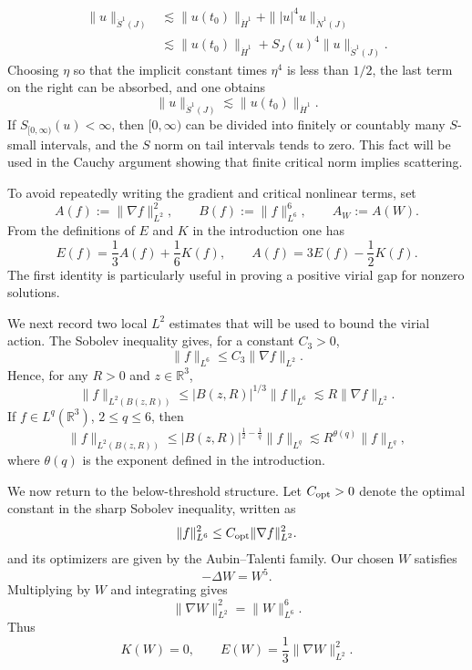 \documentclass[smallextended,envcountsect,nospthms]{svjour3}
\numberwithin{equation}{section}
\theoremstyle{spbreak}
\theoremstyle{spdefbreak}
\theoremstyle{spdefbreak}
\newcommand{\R}{\mathbb R}
\newcommand{\Nd}{\dot N^1}
\newcommand{\Sd}{\dot S^1}
\begin{document}
\[
\begin{aligned}
  \|u\|_{\Sd(J)}
  &\lesssim \|u(t_0)\|_{\dot H^1}
     +\||u|^4u\|_{\Nd(J)}  \\
  &\lesssim \|u(t_0)\|_{\dot H^1}
     +S_J(u)^4\|u\|_{\Sd(J)}.
\end{aligned}
\]
Choosing $\eta$ so that the implicit constant times $\eta^4$ is less than $1/2$, the last term on the right can be absorbed, and one obtains
\[
  \|u\|_{\Sd(J)}\lesssim \|u(t_0)\|_{\dot H^1}.
\]
If $S_{[0,\infty)}(u)<\infty$, then $[0,\infty)$ can be divided into finitely or countably many $S$-small intervals, and the $S$ norm on tail intervals tends to zero. This fact will be used in the Cauchy argument showing that finite critical norm implies scattering.

To avoid repeatedly writing the gradient and critical nonlinear terms, set
\begin{equation*}
  A(f):=\|\nabla f\|_{L^2}^2,
  \qquad B(f):=\|f\|_{L^6}^6,
  \qquad A_W:=A(W).
\end{equation*}
From the definitions of $E$ and $K$ in the introduction one has
\begin{equation}\label{eq:E-via-A-K}
  E(f)=\frac13A(f)+\frac16K(f),
  \qquad A(f)=3E(f)-\frac12K(f).
\end{equation}
The first identity is particularly useful in proving a positive virial gap for nonzero solutions.

We next record two local $L^2$ estimates that will be used to bound the virial action. The Sobolev inequality gives, for a constant $C_3>0$,
\begin{equation*}
  \|f\|_{L^6}\le C_3\|\nabla f\|_{L^2}.
\end{equation*}
Hence, for any $R>0$ and $z\in\R^3$,
\begin{equation}\label{eq:local-L2-basic}
  \|f\|_{L^2(B(z,R))}
  \le |B(z,R)|^{1/3}\|f\|_{L^6}
  \lesssim R\|\nabla f\|_{L^2}.
\end{equation}
If $f\in L^q(\R^3)$, $2\le q\le6$, then
\begin{equation}\label{eq:local-L2-Lq}
  \|f\|_{L^2(B(z,R))}
  \le |B(z,R)|^{\frac12-\frac1q}\|f\|_{L^q}
  \lesssim R^{\theta(q)}\|f\|_{L^q},
\end{equation}
where $\theta(q)$ is the exponent defined in the introduction.

We now return to the below-threshold structure. Let $C_{\rm opt}>0$ denote the optimal constant in the sharp Sobolev inequality, written as
\begin{equation*}
  \|f\|_{L^6}^2\le C_{\rm opt}\|\nabla f\|_{L^2}^2.
\end{equation*}
and its optimizers are given by the Aubin--Talenti family. Our chosen $W$ satisfies
\begin{equation*}
  -\Delta W=W^5.
\end{equation*}
Multiplying by $W$ and integrating gives
\begin{equation*}
  \|\nabla W\|_{L^2}^2=\|W\|_{L^6}^6.
\end{equation*}
Thus
\begin{equation*}
  K(W)=0,
  \qquad E(W)=\frac13\|\nabla W\|_{L^2}^2.
\end{equation*}
\end{document}
